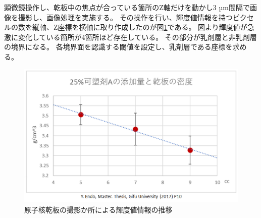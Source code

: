 \documentclass[12pt,a4paper]{jarticle}
\begin{document}
\par
顕微鏡操作し、乾板中の焦点が合っている箇所のZ軸だけを動かし3 µm間隔で画像を撮影し、画像処理を実施する。
その操作を行い、輝度値情報を持つピクセルの数を縦軸、Z座標を横軸に取り作成したのが図\ref{fig:hyoumenn_kidoti}である。
図より輝度値が急激に変化している箇所が4箇所ほど存在している。
その部分が乳剤層と非乳剤層の境界になる。
各境界面を認識する閾値を設定し、乳剤層である座標を求める。
\begin{figure}[htbp]
  \centering
     \includegraphics[width=140mm]{kasozai.png}
  \caption{原子核乾板の撮影か所による輝度値情報の推移\label{fig:hyoumenn_kidoti}}
\end{figure}
\newpage
\end{document}
